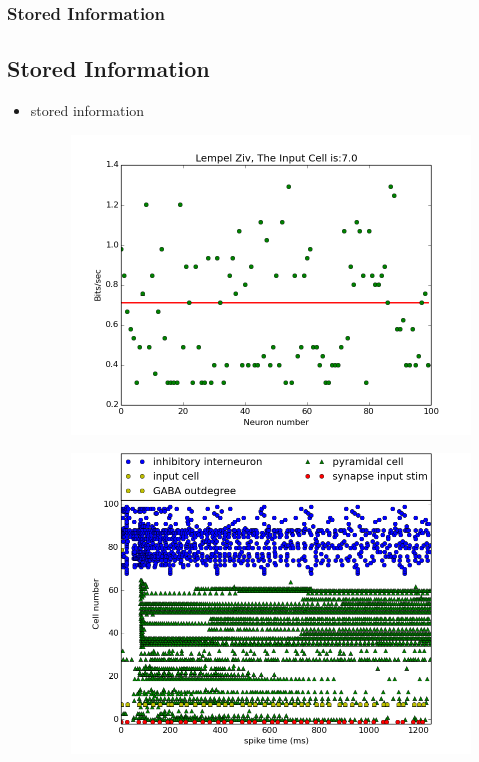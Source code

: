 \documentclass{beamer}
\begin{document}
\begin{frame}
\frametitle{Stored Information}
\subsection{Stored Information}
\begin{itemize}
\fontsize{8pt}{8pt}\selectfont 
\item stored information

\begin{figure}
\includegraphics[scale=0.25]{Lempel_Ziv0_0500_012501_00_01006_010_0.png}
\end{figure}
\begin{figure}
\includegraphics[scale=0.25]{raster_plot0_0500_012501_00_0100_00_010_0.png}
\end{figure}
\end{itemize}
\end{frame}
\end{document}
